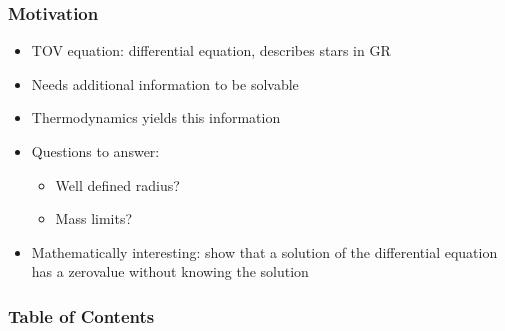 




\begin{frame}
  \titlepage
\end{frame}

\begin{frame}
	\frametitle{Motivation}
	\begin{itemize}[<+->]
		\item TOV equation: differential equation, describes stars in GR
		\item Needs additional information to be solvable
		\item Thermodynamics yields this information
		\item Questions to answer:
		\begin{itemize}
			\item Well defined radius?
			\item Mass limits?
		\end{itemize}
		\item Mathematically interesting: show that a solution of the differential equation has a zerovalue without knowing the solution
	\end{itemize} 
\end{frame}


\begin{frame}
    \frametitle{Table of Contents}
	\tableofcontents[hideallsubsections,subsubsectionstyle=hide]
\end{frame}









